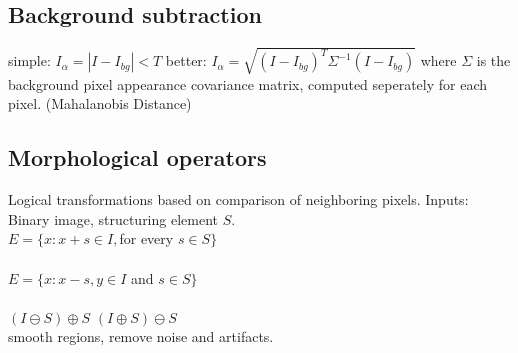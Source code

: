 \subsection*{Background subtraction}
simple: $I_\alpha = |I - I_{bg}| < T$ better: $I_\alpha = \sqrt{(I - I_{bg})^T \Sigma^{-1} (I - I_{bg})}$ where $\Sigma$ is the background pixel appearance covariance matrix, computed seperately for each pixel. (Mahalanobis Distance)
\subsection*{Morphological operators}
Logical transformations based on comparison of neighboring pixels. Inputs: Binary image, structuring element $S$. \\
 $E = \{x:x+s \in I, $for every $ s \in S\}$\\
 \\
  $E = \{x:x-s, y \in I $ and $ s \in S\}$\\
\\
 $(I \ominus S) \oplus S$ \quad
{} $(I \oplus S) \ominus S$\\
 smooth regions, remove noise and artifacts.